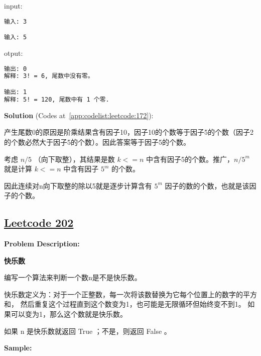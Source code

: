 input:\par

\begin{lstlisting}[language=bash]
输入: 3

输入: 5
\end{lstlisting}

otput:\par

\begin{lstlisting}[language=bash]
输出: 0
解释: 3! = 6, 尾数中没有零。

输出: 1
解释: 5! = 120, 尾数中有 1 个零.
\end{lstlisting}

\textbf{Solution }(Codes at~\ref{app:codelist:leetcode:172}):\par

产生尾数0的原因是阶乘结果含有因子10，因子10的个数等于因子5的个数（因子2的个数必然大于因子5的个数）。因此答案等于因子5的个数。\par

考虑 $n/5$ （向下取整），其结果是数 $k<=n$ 中含有因子5的个数。推广，$n/5^{m}$ 就是计算 $k<=n$ 中含有因子 $5^{m}$ 的个数。\par

因此连续对n向下取整的除以5就是逐步计算含有 $5^{m}$ 因子的数的个数，也就是该因子的个数。\par



\subsection{\href{https://leetcode-cn.com/}{Leetcode 202}}\label{app:problemlist:leetcode:202}

\textbf{Problem Description:}\par

\textbf{快乐数}\par

编写一个算法来判断一个数n是不是快乐数。\par

快乐数定义为：对于一个正整数，每一次将该数替换为它每个位置上的数字的平方和，
然后重复这个过程直到这个数变为1，也可能是无限循环但始终变不到1。
如果可以变为1，那么这个数就是快乐数。\par

如果 n 是快乐数就返回 True ；不是，则返回 False 。\par


\textbf{Sample:}\par

